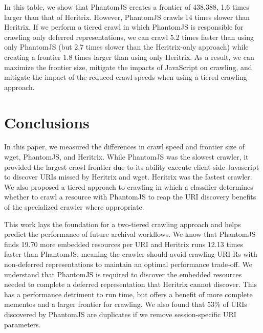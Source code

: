 \documentclass{ipres_proc_article-sp}
\begin{document}

In this table, we show that PhantomJS creates a frontier of 438,388, 1.6 times larger than that of Heritrix. However, PhantomJS crawls 14 times slower than Heritrix. If we perform a tiered crawl in which PhantomJS is responsible for crawling only deferred representations, we can crawl 5.2 times faster than using only PhantomJS (but 2.7 times slower than the Heritrix-only approach) while creating a frontier 1.8 times larger than using only Heritrix. As a result, we can maximize the frontier size, mitigate the impacts of JavaScript on crawling, and mitigate the impact of the reduced crawl speeds when using a tiered crawling approach.

\section{Conclusions}
\label{conclusion}

In this paper, we measured the differences in crawl speed and frontier size of wget, PhantomJS, and Heritrix. While PhantomJS was the slowest crawler, it provided the largest crawl frontier due to its ability execute client-side Javascript to discover URIs missed by Heritrix and wget. Heritrix was the fastest crawler. We also proposed a tiered approach to crawling in which a classifier determines whether to crawl a resource with PhantomJS to reap the URI discovery benefits of the specialized crawler where appropriate.

This work lays the foundation for a two-tiered crawling approach and helps predict the performance of future archival workflows. We know that PhantomJS finds 19.70 more embedded resources per URI and Heritrix runs 12.13 times faster than PhantomJS, meaning the crawler should avoid crawling URI-Rs with non-deferred representations to maintain an optimal performance trade-off. We understand that PhantomJS is required to discover the embedded resources needed to complete a deferred representation that Heritrix cannot discover. This has a performance detriment to run time, but offers a benefit of more complete mementos and a larger frontier for crawling. We also found that 53\% of URIs discovered by PhantomJS are duplicates if we remove session-specific URI parameters. 
\end{document}
